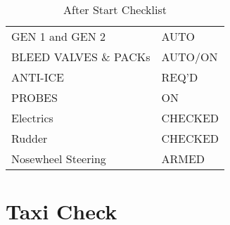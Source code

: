 \begin{table}[htbp]
\begin{minipage}{\linewidth}
\setlength{\tymax}{0.5\linewidth}
\centering
\small
\caption{After Start Checklist}
\label{afterstartchecklist}
\begin{tabulary}{\textwidth}{@{}ll@{}} \toprule
\midrule

 GEN 1 and GEN 2  & AUTO \\
 BLEED VALVES \& PACKs & AUTO\slash ON \\
 ANTI-ICE    & REQ'D \\
 PROBES    & ON  \\
 Electrics   & CHECKED \\
 Rudder    & CHECKED \\
 Nosewheel Steering & ARMED \\
\bottomrule

\end{tabulary}
\end{minipage}
\end{table}

\section{Taxi Check}
\label{taxicheck}


